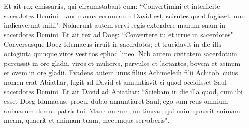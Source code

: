 \begin{biblechapter}
\verse Et ait rex emissariis, qui circumstabant eum: “Convertimini et interficite sacerdotes Domini, nam manus eorum cum David est; scientes quod fugisset, non indicaverunt mihi". Noluerunt autem servi regis extendere manum suam in sacerdotes Domini. 
\verse Et ait rex ad Doeg: “Convertere tu et irrue in sacerdotes". Conversusque Doeg Idumaeus irruit in sacerdotes; et trucidavit in die illa octoginta quinque viros vestitos ephod lineo. 
\verse Nob autem civitatem sacerdotum percussit in ore gladii, viros et mulieres, parvulos et lactantes, bovem et asinum et ovem in ore gladii. 
\verse Evadens autem unus filius Achimelech filii Achitob, cuius nomen erat Abiathar, fugit ad David 
\verse et annuntiavit ei quod occidisset Saul sacerdotes Domini. 
\verse Et ait David ad Abiathar: “Sciebam in die illa quod, cum ibi esset Doeg Idumaeus, procul dubio annuntiaret Saul; ego sum reus omnium animarum domus patris tui. 
\verse Mane mecum, ne timeas; qui enim quaerit animam meam, quaerit et animam tuam, mecumque servaberis". 
\end{biblechapter}

